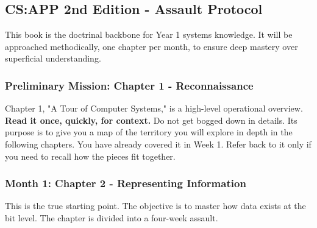 \subsection{CS:APP 2nd Edition - Assault Protocol}

This book is the doctrinal backbone for Year 1 systems knowledge. It will be approached methodically, one chapter per month, to ensure deep mastery over superficial understanding.

\subsubsection{\textbf{Preliminary Mission: Chapter 1 - Reconnaissance}}

Chapter 1, "A Tour of Computer Systems," is a high-level operational overview. \textbf{Read it once, quickly, for context.} Do not get bogged down in details. Its purpose is to give you a map of the territory you will explore in depth in the following chapters. You have already covered it in Week 1. Refer back to it only if you need to recall how the pieces fit together.

\subsubsection{\textbf{Month 1: Chapter 2 - Representing Information}}

This is the true starting point. The objective is to master how data exists at the bit level. The chapter is divided into a four-week assault.

